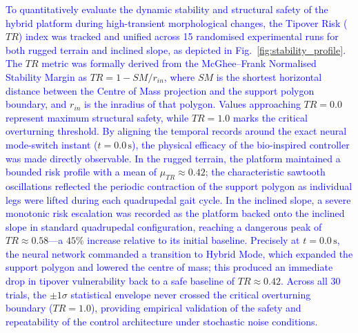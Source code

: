 \documentclass[preprint,12pt]{elsarticle}
\newcommand{\revblue}[1]{\textcolor{blue}{#1}}
\begin{document}
\revblue{To quantitatively evaluate the dynamic stability and structural safety of the hybrid platform during high-transient morphological changes, the Tipover Risk (}$TR$\revblue{) index was tracked and unified across 15 randomised experimental runs for both rugged terrain and inclined slope, as depicted in Fig.}~\ref{fig:stability_profile}\revblue{. The} $TR$ \revblue{metric was formally derived from the McGhee--Frank Normalised Stability Margin as} $TR = 1 - SM/r_{in}$\revblue{, where} $SM$ \revblue{is the shortest horizontal distance between the Centre of Mass projection and the support polygon boundary, and} $r_{in}$ \revblue{is the inradius of that polygon. Values approaching} $TR = 0.0$ \revblue{represent maximum structural safety, while} $TR = 1.0$ \revblue{marks the critical overturning threshold. By aligning the temporal records around the exact neural mode-switch instant (}$t = 0.0\,\text{s}$\revblue{), the physical efficacy of the bio-inspired controller was made directly observable. In the rugged terrain, the platform maintained a bounded risk profile with a mean of} $\mu_{TR} \approx 0.42$\revblue{; the characteristic sawtooth oscillations reflected the periodic contraction of the support polygon as individual legs were lifted during each quadrupedal gait cycle. In the inclined slope, a severe monotonic risk escalation was recorded as the platform backed onto the inclined slope in standard quadrupedal configuration, reaching a dangerous peak of} $TR \approx 0.58$\revblue{---a} $45\%$ \revblue{increase relative to its initial baseline. Precisely at} $t = 0.0\,\text{s}$\revblue{, the neural network commanded a transition to Hybrid Mode, which expanded the support polygon and lowered the centre of mass; this produced an immediate drop in tipover vulnerability back to a safe baseline of} $TR \approx 0.42$\revblue{. Across all 30 trials, the} $\pm 1\sigma$ \revblue{statistical envelope never crossed the critical overturning boundary (}$TR = 1.0$\revblue{), providing empirical validation of the safety and repeatability of the control architecture under stochastic noise conditions.}
\end{document}
